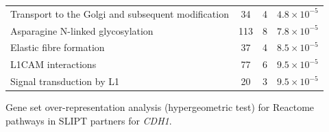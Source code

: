 \begin{table}[!ht]
{\begin{threeparttable}
\begin{tabular}{lccc}
  \rowcolor{black!5}
  Transport to the Golgi and subsequent modification &  34 &   4 & $4.8 \times 10^{-5}$ \\ 
  \rowcolor{black!10}
  Asparagine N-linked glycosylation & 113 &   8 & $7.8 \times 10^{-5}$ \\ 
  \rowcolor{black!5}
  Elastic fibre formation &  37 &   4 & $8.5 \times 10^{-5}$ \\ 
  \rowcolor{black!10}
  L1CAM interactions &  77 &   6 & $9.5 \times 10^{-5}$ \\ 
  \rowcolor{black!5}
  Signal transduction by L1 &  20 &   3 & $9.5 \times 10^{-5}$ \\ 
  \hline
\end{tabular}
\begin{tablenotes}
\raggedright \small
Gene set over-representation analysis (hypergeometric test) for Reactome pathways in SLIPT partners for \textit{CDH1}.
\end{tablenotes}
\end{threeparttable}
}
\end{table}

\FloatBarrier
\fi